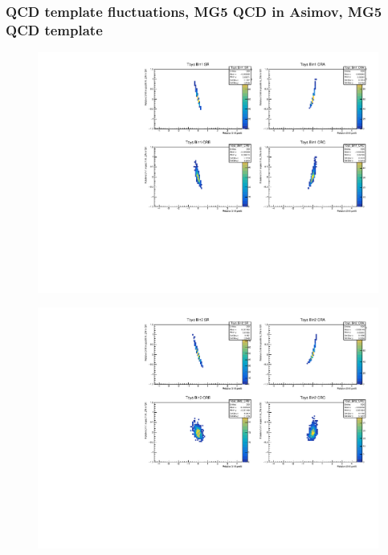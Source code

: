\subsubsection{\mjj QCD template fluctuations, MG5 QCD in Asimov, MG5 QCD template}
\begin{figure}[H]
\includegraphics[width=\textwidth]{plots/diffx/instab/linearfx/instabilities_mjj_QCD_Mgraph_Signal_Sh2211_BSMCQCDSTATS_linearfx_newbinning_madgraphasimov_bin1.pdf}
\end{figure}
\begin{figure}[H]
\includegraphics[width=\textwidth]{plots/diffx/instab/linearfx/instabilities_mjj_QCD_Mgraph_Signal_Sh2211_BSMCQCDSTATS_linearfx_newbinning_madgraphasimov_bin2.pdf}
\end{figure}
